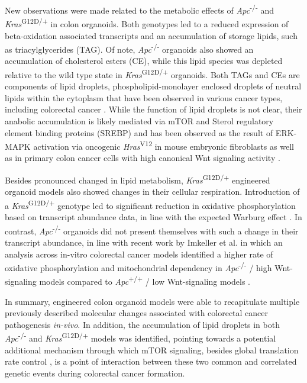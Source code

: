\begin{flushleft}
New observations were made related to the metabolic effects of \textit{Apc}\textsuperscript{-/-} and \textit{Kras}\textsuperscript{G12D/+} in colon organoids. Both genotypes led to a reduced expression of beta-oxidation associated transcripts and an accumulation of storage lipids, such as triacylglycerides (TAG). Of note, \textit{Apc}\textsuperscript{-/-} organoids also showed an accumulation of cholesterol esters (CE), while this lipid species was depleted relative to the wild type state in \textit{Kras}\textsuperscript{G12D/+} organoids. Both TAGs and CEs are components of lipid droplets, phospholipid-monolayer enclosed droplets of neutral lipids within the cytoplasm that have been observed in various cancer types, including colorectal cancer \parencite{cruzLipidDropletsPlatforms2020, acciolyLipidBodiesAre2008}. While the function of lipid droplets is not clear, their anabolic accumulation is likely mediated via mTOR and Sterol regulatory element binding proteins (SREBP) \parencite{cruzLipidDropletsPlatforms2020} and has been observed as the result of ERK-MAPK activation via oncogenic \textit{Hras}\textsuperscript{V12} in mouse embryonic fibroblasts \parencite{cruzCellCycleProgression2019} as well as in primary colon cancer cells with high canonical Wnt signaling activity \parencite{tirinatoLipidDropletsNew2015}.
\smallbreak

Besides pronounced changed in lipid metabolism, \textit{Kras}\textsuperscript{G12D/+} engineered organoid models also showed changes in their cellular respiration. Introduction of a \textit{Kras}\textsuperscript{G12D/+} genotype led to significant reduction in oxidative phosphorylation based on transcript abundance data, in line with the expected Warburg effect \parencite{deberardinisWeNeedTalk2020}. In contrast, \textit{Apc}\textsuperscript{-/-} organoids did not present themselves with such a change in their transcript abundance, in line with recent work by Imkeller et al. in which an analysis across in-vitro colorectal cancer models identified a higher rate of oxidative phosphorylation and mitochondrial dependency in \textit{Apc}\textsuperscript{-/-} / high Wnt-signaling models compared to \textit{Apc}\textsuperscript{+/+} / low Wnt-signaling models \parencite{imkellerMetabolicBalanceColorectal2022}. 
\smallbreak

In summary, engineered colon organoid models were able to recapitulate multiple previously described molecular changes associated with colorectal cancer pathogenesis \textit{in-vivo}. In addition, the accumulation of lipid droplets in both \textit{Apc}\textsuperscript{-/-} and \textit{Kras}\textsuperscript{G12D/+} models was identified, pointing towards a potential additional mechanism through which mTOR signaling, besides global translation rate control \parencite{smitDriverMutationsAdenomacarcinoma2020}, is a point of interaction between these two common and correlated genetic events during colorectal cancer formation. 


\end{flushleft}
